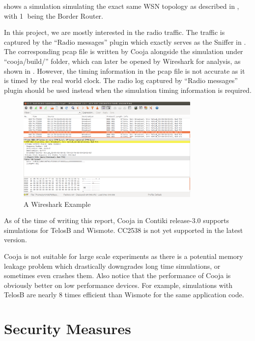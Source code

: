  shows a simulation simulating the exact same WSN topology as described in , with \textcircled{1} being the Border Router. 

In this project, we are mostly interested in the radio traffic. The traffic is captured by the ``Radio messages'' plugin which exactly serves as the Sniffer in . The corresponding pcap file is written by Cooja alongside the simulation under ``cooja/build/'' folder, which can later be opened by Wireshark\cite{Wireshark} for analysis, as shown in .
 However, the timing information in the pcap file is not accurate as it is timed by the real world clock. The radio log captured by “Radio messages” plugin should be used instead when the simulation timing information is required.
 
\begin{figure}[h!]
	\center
	\includegraphics[width=0.8\textwidth]{fig/wireshark_example.png}
	\caption{A Wireshark Example}
	\label{Fig: A Wireshark Example}
\end{figure}

As of the time of writing this report, Cooja in Contiki release-3.0 supports simulations for TelosB and Wismote. CC2538 is not yet supported in the latest version.

Cooja is not suitable for large scale experiments as there is a potential memory leakage problem which drastically downgrades long time simulations, or sometimes even crashes them. Also notice that the performance of Cooja is obviously better on low performance devices. For example, simulations with TelosB are nearly 8 times efficient than Wismote for the same application code.

\section{Security Measures}

